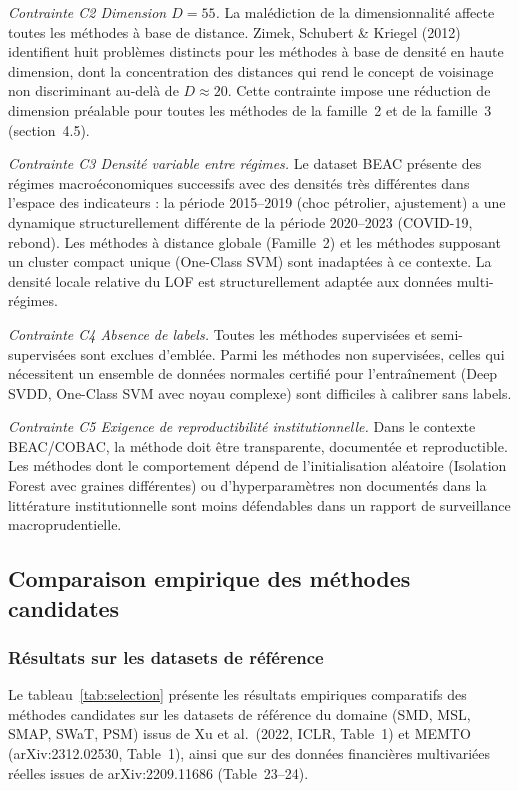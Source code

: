 \documentclass[12pt,a4paper]{article}
\begin{document}
\textit{Contrainte C2  Dimension $D = 55$.} La malédiction de la
dimensionnalité affecte toutes les méthodes à base de distance. Zimek,
Schubert \& Kriegel (2012) identifient huit problèmes distincts pour les
méthodes à base de densité en haute dimension, dont la concentration des
distances qui rend le concept de voisinage non discriminant au-delà de
$D \approx 20$. Cette contrainte impose une réduction de dimension préalable
pour toutes les méthodes de la famille~2 et de la famille~3 (section~4.5).

\textit{Contrainte C3  Densité variable entre régimes.} Le dataset BEAC
présente des régimes macroéconomiques successifs avec des densités très
différentes dans l'espace des indicateurs : la période 2015--2019 (choc
pétrolier, ajustement) a une dynamique structurellement différente de la
période 2020--2023 (COVID-19, rebond). Les méthodes à distance globale
(Famille~2) et les méthodes supposant un cluster compact unique (One-Class
SVM) sont inadaptées à ce contexte. La densité locale relative du LOF est
structurellement adaptée aux données multi-régimes.

\textit{Contrainte C4  Absence de labels.} Toutes les méthodes supervisées
et semi-supervisées sont exclues d'emblée. Parmi les méthodes non supervisées,
celles qui nécessitent un ensemble de données normales certifié pour
l'entraînement (Deep SVDD, One-Class SVM avec noyau complexe) sont
difficiles à calibrer sans labels.

\textit{Contrainte C5  Exigence de reproductibilité institutionnelle.} Dans
le contexte BEAC/COBAC, la méthode doit être transparente, documentée et
reproductible. Les méthodes dont le comportement dépend de l'initialisation
aléatoire (Isolation Forest avec graines différentes) ou d'hyperparamètres
non documentés dans la littérature institutionnelle sont moins défendables
dans un rapport de surveillance macroprudentielle.

\subsection{Comparaison empirique des méthodes candidates}

\subsubsection{Résultats sur les datasets de référence}

Le tableau~\ref{tab:selection} présente les résultats empiriques comparatifs
des méthodes candidates sur les datasets de référence du domaine (SMD, MSL,
SMAP, SWaT, PSM) issus de Xu et al.\ (2022, ICLR, Table~1) et MEMTO
(arXiv:2312.02530, Table~1), ainsi que sur des données financières multivariées
réelles issues de arXiv:2209.11686 (Table~23--24).
\end{document}
